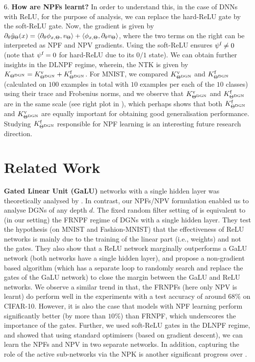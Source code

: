 \documentclass{article}
\begin{document}
$6.$ \textbf{How are NPFs learnt?} In order to understand this, in the case of DNNs with ReLU, for the purpose of analysis,  we can replace the hard-ReLU gate by the soft-ReLU gate. Now, the gradient is given by $\partial_{\theta}\hat{y}_{\Theta}(x)=\langle \partial_{\theta} \phi_{x,\Theta},v_{\Theta}\rangle+\langle \phi_{x,\Theta},\partial_{\theta} v_{\Theta}\rangle$, where the two terms on the right can be interpreted as NPF and NPV gradients. Using the soft-ReLU ensures $\psi^{\text{f}}\neq 0$ (note that $\psi^{\text{f}}=0$ for hard-ReLU due to its $0/1$ state). We can obtain further insights in the DLNPF regime, wherein, the NTK is given by $K_{\Theta^{\text{DGN}}}=K^{\text{v}}_{\Theta^{\text{DGN}}}+K^{\text{f}}_{\Theta^{\text{DGN}}}$. For MNIST, we compared $K^{\text{v}}_{\Theta^{\text{DGN}}}$ and $K^{\text{f}}_{\Theta^{\text{DGN}}}$ (calculated on $100$ examples in total with $10$ examples per each of the $10$ classes) using their trace and Frobenius norms, and we observe that $K^{\text{v}}_{\Theta^{\text{DGN}}}$ and $K^{\text{f}}_{\Theta^{\text{DGN}}}$ are in the same scale (see right plot in ), which perhaps shows that both $K^{\text{f}}_{\Theta^{\text{DGN}}}$ and $K^{\text{v}}_{\Theta^{\text{DGN}}}$ are equally important for obtaining good generalisation performance. Studying $K^{\text{f}}_{\Theta^{\text{DGN}}}$ responsible for NPF learning is an interesting future research direction.

\section{Related Work}
\textbf{Gated Linear Unit (GaLU)} networks with a single hidden layer was theoretically analysed by \cite{sss,fiat}. In contrast, our NPFs/NPV formulation enabled us to analyse DGNs of any depth $d$. The fixed random filter setting of \cite{fiat} is equivalent to (in our setting) the FRNPF regime of DGNs with a single hidden layer. They test the hypothesis (on MNIST and Fashion-MNIST) that the effectiveness of ReLU networks is mainly due to the training of the linear part (i.e., weights) and not the gates. They also show that a ReLU network marginally outperforms a GaLU network (both networks have a single hidden layer), and propose a non-gradient based algorithm (which has a separate loop to randomly search and replace the gates of the GaLU network) to close the margin between the GaLU and ReLU networks. We observe a similar trend in that, the FRNPFs (here only NPV is learnt) do perform well in the experiments with a test accuracy of around $68\%$ on CIFAR-10. However, it is also the case that models with NPF learning perform significantly better (by more than $10\%$) than FRNPF, which underscores the importance of the gates. Further, we used soft-ReLU gates in the DLNPF regime, and showed that using standard optimisers (based on gradient descent), we can learn the NPFs and NPV in two separate networks. In addition, capturing the role of the active sub-networks via the NPK is another significant progress over \cite{sss,fiat}.
\end{document}
